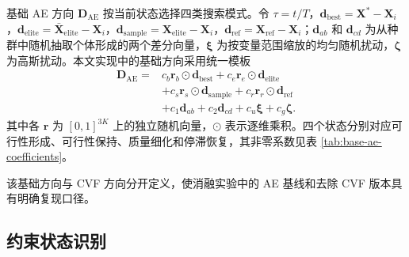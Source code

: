基础 AE 方向 $\mathbf D_{\mathrm{AE}}$ 按当前状态选择四类搜索模式。令 $\tau=t/T$，$\mathbf d_{\mathrm{best}}=\mathbf X^*-\mathbf X_i$，$\mathbf d_{\mathrm{elite}}=\bar{\mathbf X}_{\mathrm{elite}}-\mathbf X_i$，$\mathbf d_{\mathrm{sample}}=\mathbf X_{\mathrm{elite}}-\mathbf X_i$，$\mathbf d_{\mathrm{ref}}=\mathbf X_{\mathrm{ref}}-\mathbf X_i$；$\mathbf d_{ab}$ 和 $\mathbf d_{cd}$ 为从种群中随机抽取个体形成的两个差分向量，$\boldsymbol\xi$ 为按变量范围缩放的均匀随机扰动，$\boldsymbol\zeta$ 为高斯扰动。本文实现中的基础方向采用统一模板
\begin{equation}
    \begin{aligned}
    \mathbf D_{\mathrm{AE}}
    ={}&c_b\mathbf r_b\odot\mathbf d_{\mathrm{best}}
    +c_e\mathbf r_e\odot\mathbf d_{\mathrm{elite}}\\
    &+c_s\mathbf r_s\odot\mathbf d_{\mathrm{sample}}
    +c_r\mathbf r_r\odot\mathbf d_{\mathrm{ref}}\\
    &+c_1\mathbf d_{ab}+c_2\mathbf d_{cd}
    +c_u\boldsymbol\xi+c_g\boldsymbol\zeta .
    \end{aligned}
\label{eq:ae-state-direction}
\end{equation}
其中各 $\mathbf r$ 为 $[0,1]^{3K}$ 上的独立随机向量，$\odot$ 表示逐维乘积。四个状态分别对应可行性形成、可行性保持、质量细化和停滞恢复，其非零系数见表 \ref{tab:base-ae-coefficients}。

\begin{table}[tbp]
\centering
\caption{基础 AE 方向在不同状态下的非零系数}
\label{tab:base-ae-coefficients}
\scriptsize
{}
\end{table}

该基础方向与 CVF 方向分开定义，使消融实验中的 AE 基线和去除 CVF 版本具有明确复现口径。

\subsection{约束状态识别}

